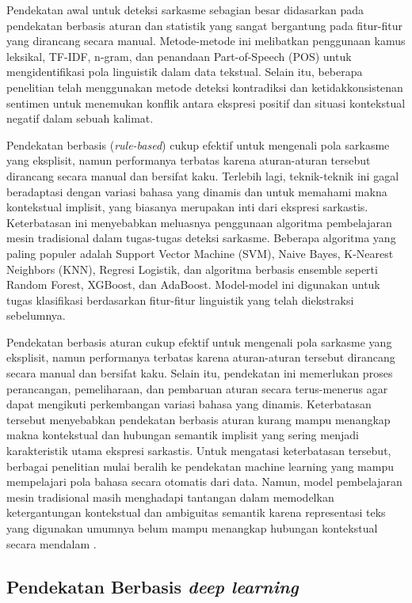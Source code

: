 Pendekatan awal untuk deteksi sarkasme sebagian besar didasarkan pada pendekatan berbasis aturan dan statistik yang sangat bergantung pada fitur-fitur yang dirancang secara manual. Metode-metode ini melibatkan penggunaan kamus leksikal, TF-IDF, n-gram, dan penandaan Part-of-Speech (POS) untuk mengidentifikasi pola linguistik dalam data tekstual. Selain itu, beberapa penelitian telah menggunakan metode deteksi kontradiksi dan ketidakkonsistenan sentimen untuk menemukan konflik antara ekspresi positif dan situasi kontekstual negatif dalam sebuah kalimat.

Pendekatan berbasis (\textit{rule-based}) cukup efektif untuk mengenali pola sarkasme yang eksplisit, namun performanya terbatas karena aturan-aturan tersebut dirancang secara manual dan bersifat kaku. Terlebih lagi, teknik-teknik ini gagal beradaptasi dengan variasi bahasa yang dinamis dan untuk memahami makna kontekstual implisit, yang biasanya merupakan inti dari ekspresi sarkastis. Keterbatasan ini menyebabkan meluasnya penggunaan algoritma pembelajaran mesin tradisional dalam tugas-tugas deteksi sarkasme. Beberapa algoritma yang paling populer adalah Support Vector Machine (SVM), Naive Bayes, K-Nearest Neighbors (KNN), Regresi Logistik, dan algoritma berbasis ensemble seperti Random Forest, XGBoost, dan AdaBoost. Model-model ini digunakan untuk tugas klasifikasi berdasarkan fitur-fitur linguistik yang telah diekstraksi sebelumnya.

Pendekatan berbasis aturan cukup efektif untuk mengenali pola sarkasme yang eksplisit, namun performanya terbatas karena aturan-aturan tersebut dirancang secara manual dan bersifat kaku. Selain itu, pendekatan ini memerlukan proses perancangan, pemeliharaan, dan pembaruan aturan secara terus-menerus agar dapat mengikuti perkembangan variasi bahasa yang dinamis. Keterbatasan tersebut menyebabkan pendekatan berbasis aturan kurang mampu menangkap makna kontekstual dan hubungan semantik implisit yang sering menjadi karakteristik utama ekspresi sarkastis. Untuk mengatasi keterbatasan tersebut, berbagai penelitian mulai beralih ke pendekatan machine learning yang mampu mempelajari pola bahasa secara otomatis dari data. Namun, model pembelajaran mesin tradisional masih menghadapi tantangan dalam memodelkan ketergantungan kontekstual dan ambiguitas semantik karena representasi teks yang digunakan umumnya belum mampu menangkap hubungan kontekstual secara mendalam \cite{dubey2025unpacking}.

\subsection{Pendekatan Berbasis \textit{deep learning}}

